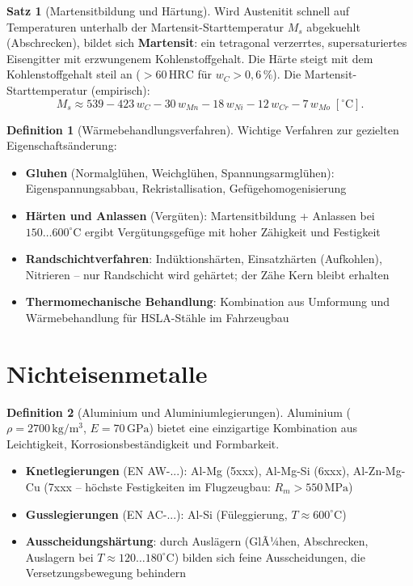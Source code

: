 ﻿\documentclass[a4paper,12pt]{report}
\theoremstyle{definition}
\newtheorem{definition}{Definition}
\newtheorem{satz}{Satz}
\begin{document}
\begin{satz}[Martensitbildung und H\"artung]
Wird Austenitit schnell auf Temperaturen unterhalb der Martensit-Starttemperatur
$M_s$ abgekuehlt (Abschrecken), bildet sich \textbf{Martensit}:
ein tetragonal verzerrtes, supersaturiertes Eisengitter mit
erzwungenem Kohlenstoffgehalt. Die H\"arte steigt mit dem Kohlenstoffgehalt
steil an ($> 60\,\mathrm{HRC}$ f\"ur $w_C > 0{,}6\,\%$).
Die Martensit-Starttemperatur (empirisch):
\[
  M_s \approx 539 - 423\,w_C - 30\,w_{Mn} - 18\,w_{Ni} - 12\,w_{Cr} - 7\,w_{Mo}\;[^\circ\mathrm{C}].
\]
\end{satz}

\begin{definition}[W\"armebehandlungsverfahren]
Wichtige Verfahren zur gezielten Eigenschafts\"anderung:
\begin{itemize}
    \item[-] \textbf{Gluhen} (Normalgl\"uhen, Weichgl\"uhen, Spannungsarmgl\"uhen):
          Eigenspannungsabbau, Rekristallisation, Gef\"ugehomogenisierung
    \item[-] \textbf{H\"arten und Anlassen} (Verg\"uten): Martensitbildung + Anlassen
          bei $150\ldots600^\circ\mathrm{C}$ ergibt Verg\"utungsgef\"uge
          mit hoher Z\"ahigkeit und Festigkeit
    \item[-] \textbf{Randschichtverfahren}: Ind\"uktionsh\"arten, Einsatzh\"arten
          (Aufkohlen), Nitrieren -- nur Randschicht wird geh\"artet;
          der Z\"ahe Kern bleibt erhalten
    \item[-] \textbf{Thermomechanische Behandlung}: Kombination aus Umformung
          und W\"armebehandlung f\"ur HSLA-St\"ahle im Fahrzeugbau
\end{itemize}
\end{definition}

\section{Nichteisenmetalle}

\begin{definition}[Aluminium und Aluminiumlegierungen]
Aluminium ($\rho = 2700\,\mathrm{kg/m^3}$, $E = 70\,\mathrm{GPa}$) bietet
eine einzigartige Kombination aus Leichtigkeit, Korrosionsbest\"andigkeit
und Formbarkeit.
\begin{itemize}
    \item[-] \textbf{Knetlegierungen} (EN AW-...): Al-Mg (5xxx), Al-Mg-Si (6xxx),
          Al-Zn-Mg-Cu (7xxx -- h\"ochste Festigkeiten im Flugzeugbau: $R_m > 550\,\mathrm{MPa}$)
    \item[-] \textbf{Gusslegierungen} (EN AC-...): Al-Si (F\"uleggierung, $T\approx600^\circ\mathrm{C}$)
    \item[-] \textbf{Ausscheidungsh\"artung}: durch Ausl\"agern (GlÃ¼hen, Abschrecken,
          Auslagern bei $T\approx 120\ldots180^\circ\mathrm{C}$) bilden sich
          feine Ausscheidungen, die Versetzungsbewegung behindern
\end{itemize}
\end{definition}
\end{document}
